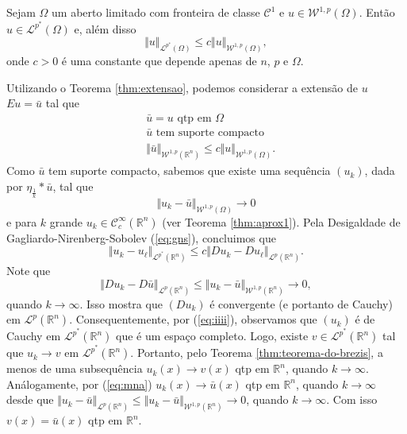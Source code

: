 \documentclass[a4paper, 11pt]{book}
\theoremstyle{definition}
\newcommand{\bR}{\mathbb{R}}
\newcommand{\cC}{\mathcal{C}}
\newcommand{\cL}{\mathcal{L}}
\newcommand{\cW}{\mathcal{W}}
\begin{document}
\begin{tbox} \label{thm:desigualdade-teorema-2}
    Sejam $\Omega$ um aberto limitado com fronteira de classe $\cC^1$ e $u \in \cW^{1,p}(\Omega)$. Então $u \in \cL^{p^*}(\Omega)$ e, além disso
    \[
        \Vert u \Vert_{\cL^{p^*}(\Omega)} \leqslant c \Vert u \Vert_{\cW^{1,p}(\Omega)},
    \]
    onde $c > 0$ é uma constante que depende apenas de $n$, $p$ e $\Omega$.
\end{tbox}
\begin{prf}
    Utilizando o Teorema \ref{thm:extensao}, podemos considerar a extensão de $u$ $Eu = \bar u$ tal que
    \begin{equation} \label{eq:man}
        \begin{aligned}
            &\bar u = u \text{ qtp em } \Omega\\
            &\bar u \text{ tem suporte compacto}\\
            &\Vert \bar u \Vert_{\cW^{1,p}(\bR^n)} \leqslant c\Vert u \Vert_{\cW^{1,p}(\Omega)}.
        \end{aligned}
    \end{equation}
    Como $\bar u$ tem suporte compacto, sabemos que existe uma sequência $(u_k)$, dada por $\eta_{\frac{1}{k}} * \bar u$, tal que
    \begin{equation} \label{eq:mna}
        \Vert u_k - \bar u \Vert_{\cW^{1,p}(\Omega)} \to 0
    \end{equation}
    e para $k$ grande $u_k \in \cC^{\infty}_c(\bR^n)$ (ver Teorema \ref{thm:aprox1}).
    Pela Desigaldade de Gagliardo-Nirenberg-Sobolev (\ref{eq:gns}), concluimos que
    \begin{equation} \label{eq:iiii}
        \Vert u_k - u_\ell \Vert_{\cL^{p^*}(\bR^n)} \leqslant c \Vert Du_k - Du_\ell \Vert_{\cL^p(\bR^n)}.
    \end{equation}
    Note que
    \[
        \Vert Du_k - D\bar u \Vert_{\cL^p(\bR^n)} \leqslant \Vert u_k - \bar u \Vert_{\cW^{1,p}(\bR^n)} \to 0,
    \]
    quando $k \to \infty$.
    Isso mostra que $(Du_k)$ é convergente (e portanto de Cauchy) em $\cL^p(\bR^n)$.
    Consequentemente, por (\ref{eq:iiii}), observamos que $(u_k)$ é de Cauchy em $\cL^{p^*}(\bR^n)$ que é um espaço completo. Logo, existe $v \in \cL^{p^*}(\bR^n)$ tal que $u_k \to v$ em $\cL^{p^*}(\bR^n)$. Portanto, pelo Teorema \ref{thm:teorema-do-brezis}, a menos de uma subsequência $u_k(x) \to v(x)$ qtp em $\bR^n$, quando $k \to \infty$. Análogamente, por (\ref{eq:mna}) $u_k(x) \to \bar u(x)$ qtp em $\bR^n$, quando $k \to \infty$ desde que $\Vert u_k - \bar u \Vert_{\cL^p(\bR^n)} \leqslant \Vert u_k - \bar u \Vert_{\cW^{1,p}(\bR^n)} \to 0$, quando $k \to \infty$. Com isso $v(x) = \bar u(x)$ qtp em $\bR^n$.

\end{prf}
\end{document}
